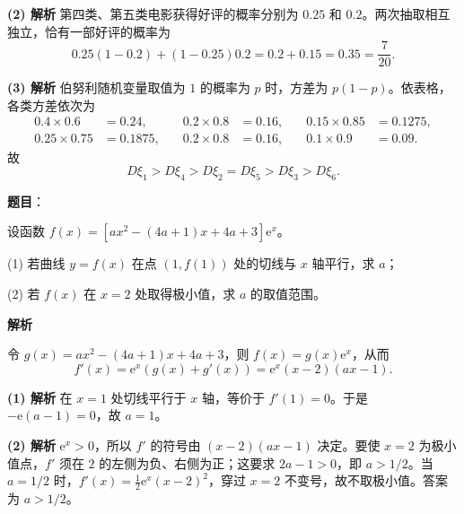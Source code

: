 \begin{answer}
\textbf{(2) 解析} 第四类、第五类电影获得好评的概率分别为 $0.25$ 和 $0.2$。两次抽取相互独立，恰有一部好评的概率为
\nopagebreak[4]
\[
0.25(1-0.2)+(1-0.25)0.2=0.2+0.15=0.35=\frac7{20}.
\]

\textbf{(3) 解析} 伯努利随机变量取值为 $1$ 的概率为 $p$ 时，方差为 $p(1-p)$。依表格，各类方差依次为
\nopagebreak[4]
\[
\begin{aligned}
0.4\times0.6&=0.24,&\quad 0.2\times0.8&=0.16,&\quad 0.15\times0.85&=0.1275,\\
0.25\times0.75&=0.1875,&\quad 0.2\times0.8&=0.16,&\quad 0.1\times0.9&=0.09.
\end{aligned}
\]
故
\nopagebreak[4]
\[
D\xi_1>D\xi_4>D\xi_2=D\xi_5>D\xi_3>D\xi_6.
\]




\end{answer}
\begin{answer}

\textbf{题目}：

设函数 $f(x)=\left[ax^2-(4a+1)x+4a+3\right]\mathrm e^x$。

(1) 若曲线 $y=f(x)$ 在点 $(1,f(1))$ 处的切线与 $x$ 轴平行，求 $a$；

(2) 若 $f(x)$ 在 $x=2$ 处取得极小值，求 $a$ 的取值范围。

\textbf{解析}

令 $g(x)=ax^2-(4a+1)x+4a+3$，则 $f(x)=g(x)\mathrm e^x$，从而
\nopagebreak[4]
\[
f'(x)=\mathrm e^x(g(x)+g'(x))=\mathrm e^x(x-2)(ax-1).
\]

\textbf{(1) 解析} 在 $x=1$ 处切线平行于 $x$ 轴，等价于 $f'(1)=0$。于是 $-\mathrm e( a-1)=0$，故 $a=1$。

\textbf{(2) 解析} $\mathrm e^x>0$，所以 $f'$ 的符号由 $(x-2)(ax-1)$ 决定。要使 $x=2$ 为极小值点，$f'$ 须在 $2$ 的左侧为负、右侧为正；这要求 $2a-1>0$，即 $a>1/2$。当 $a=1/2$ 时，$f'(x)=\tfrac12\mathrm e^x(x-2)^2$，穿过 $x=2$ 不变号，故不取极小值。答案为 $a>1/2$。



\end{answer}
